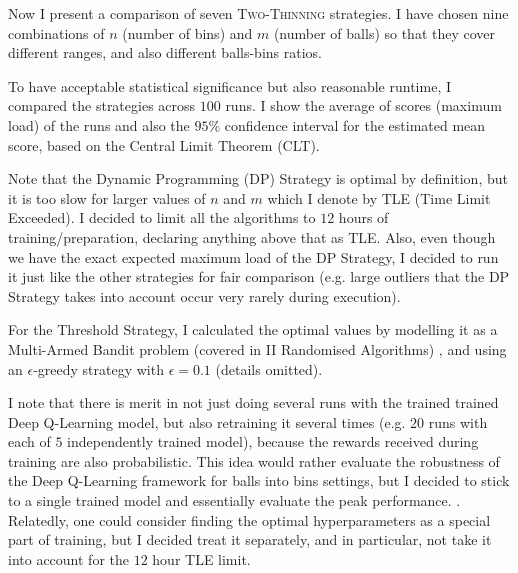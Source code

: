 Now I present a comparison of seven \textsc{Two-Thinning} strategies. I have chosen nine combinations of $n$ (number of bins) and $m$ (number of balls) so that they cover different ranges, and also different balls-bins ratios.


To have acceptable statistical significance but also reasonable runtime, I compared the strategies across $100$ runs. I show the average of scores (maximum load) of the runs and also the $95\%$ confidence interval for the estimated mean score, based on the Central Limit Theorem (CLT). 


Note that the Dynamic Programming (DP) Strategy is optimal by definition, but it is too slow for larger values of $n$ and $m$ which I denote by TLE (Time Limit Exceeded). I decided to limit all the algorithms to $12$ hours of training/preparation, declaring anything above that as TLE. Also, even though we have the exact expected maximum load of the DP Strategy, I decided to run it just like the other strategies for fair comparison (e.g. large outliers that the DP Strategy takes into account occur very rarely during execution).


For the Threshold Strategy, I calculated the optimal values by modelling it as a Multi-Armed Bandit problem (covered in II Randomised Algorithms) \cite{katehakis1987multiarmedbandit}, and using an $\epsilon$-greedy strategy with $\epsilon=0.1$ (details omitted).


I note that there is merit in not just doing several runs with the trained trained Deep Q-Learning model, but also retraining it several times (e.g. $20$ runs with each of $5$ independently trained model), because the rewards received during training are also probabilistic. This idea would rather evaluate the robustness of the Deep Q-Learning framework for balls into bins settings, but I decided to stick to a single trained model and essentially evaluate the peak performance. . Relatedly, one could consider finding the optimal hyperparameters as a special part of training, but I decided treat it separately, and in particular, not take it into account for the $12$ hour TLE limit.


